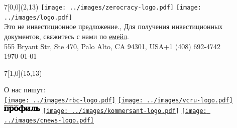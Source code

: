 \documentclass{deck}
\begin{document}
\setlength{\parindent}{0pt} %

\setlength{\fboxsep}{2pt}
\newcommand\point[2]{\vbox{\raggedright\small%
  \fcolorbox{zgreen}{white}{\color{zgreen}#1}\newline%
  \footnotesize#2\vspace{16pt}}}
\newcommand\highlight[1]{\colorbox{zgreen}{\color{white}\thinspace{#1}\thinspace}}

\begin{textblock}{7}[0,0](2,13){
  \color{gray}\footnotesize
  \texttt{[image: ../images/zerocracy-logo.pdf]}
  \texttt{[image: ../images/logo.pdf]}\\
  Это не инвестиционное предложение.,
  Для получения инвестиционных документов, свяжитесь с нами по \href{mailto:cio@zerocracy.com}{емейл}.\\
  555 Bryant Str, Ste 470, Palo Alto, CA 94301, USA\quad+1 (408) 692-4742\\
  \today\quad\zoldversion
}\end{textblock}

\begin{textblock}{7}[1,0](15,13){\begin{flushright}
  \color{gray}\footnotesize
  О нас пишут:\\[4pt]
  \href{https://www.rbc.ru/crypto/news/5c0f98a79a79479329c12358}{\texttt{[image: ../images/rbc-logo.pdf]}}
  \quad
  \href{https://vc.ru/life/53597-pochemu-proekty-pod-upravleniem-robota-v-3-raza-rentabelnee}{\texttt{[image: ../images/vcru-logo.pdf]}}
  \quad
  \href{https://profile.ru/scitech/doveryaya-svoyu-sudbu-iskusstvennomu-intellektu-chelovechestvo-silno-riskuet-67048/}{\includegraphics[height=12pt]{../images/profil-logo.png}}
  \quad
  \href{https://www.kommersant.ru/doc/3811862}{\texttt{[image: ../images/kommersant-logo.pdf]}}
  \quad
  \href{http://www.cnews.ru/news/line/2018-12-05_zerocracy_zapustila_kriptovalyutu_zold_dlya_mikroplatezhej}{\texttt{[image: ../images/cnews-logo.pdf]}}
\end{flushright}}\end{textblock}
\end{document}
